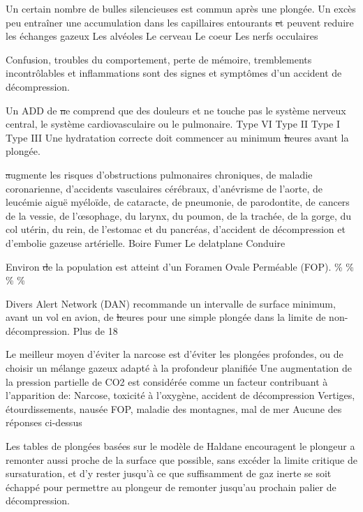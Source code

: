 \documentclass[english,10pt,twoside]{article}
\begin{document}
\begin{outline}
		\1 Un certain nombre de bulles silencieuses est commun après une plongée. Un excès peu entraîner une accumulation dans les capillaires entourants \st et peuvent reduire les échanges gazeux
			\2 Les alvéoles
			\2 Le cerveau
			\2 Le coeur
			\2 Les nerfs occulaires

		\1 Confusion, troubles du comportement, perte de mémoire, tremblements incontrôlables et inflammations sont des signes et symptômes d'un accident de décompression.\vf

		\1 Un ADD de \st ne comprend que des douleurs et ne touche pas le système nerveux central, le système cardiovasculaire ou le pulmonaire.
			\2 Type VI
			\2 Type II
			\2 Type I
			\2 Type III
		\1 Une hydratation correcte doit commencer au minimum	\st heures avant la plongée.

		\1 \st augmente les risques d'obstructions pulmonaires chroniques, de maladie coronarienne, d'accidents vasculaires cérébraux, d'anévrisme de l'aorte, de leucémie aiguë myéloïde, de cataracte, de pneumonie, de parodontite, de cancers de la vessie, de l'œsophage, du larynx, du poumon, de la trachée, de la gorge, du col utérin, du rein, de l'estomac et du pancréas, d'accident de décompression et d'embolie gazeuse artérielle.
			\2 Boire
			\2 Fumer
			\2 Le delatplane
			\2 Conduire

		\1 Environ \st de la population est atteint d'un Foramen Ovale Perméable (FOP).
			\%
			\%
			\%
			\%

		\1 Divers Alert Network (DAN) recommande un intervalle de surface minimum, avant un vol en avion, de \st heures pour une simple plongée dans la limite de non-décompression.
			\2 Plus de 18
			\2 18

		\1 Le meilleur moyen d'éviter la narcose est d'éviter les plongées profondes, ou de choisir un mélange gazeux adapté à la profondeur planifiée\vf	
		\1 Une augmentation de la pression partielle de CO2 est considérée comme un facteur contribuant à l'apparition de:
			\2 Narcose, toxicité à l'oxygène, accident de décompression
			\2 Vertiges, étourdissements, nausée
			\2 FOP, maladie des montagnes, mal de mer
			\2 Aucune des réponses ci-dessus

		\1 Les tables de plongées basées sur le modèle de Haldane encouragent le plongeur a remonter aussi proche de la surface que possible, sans excéder la limite critique de sursaturation, et d'y rester jusqu'à ce que suffisamment de gaz inerte se soit échappé pour permettre au plongeur de remonter jusqu'au prochain palier de décompression.\vf



\end{outline}
\end{document}

